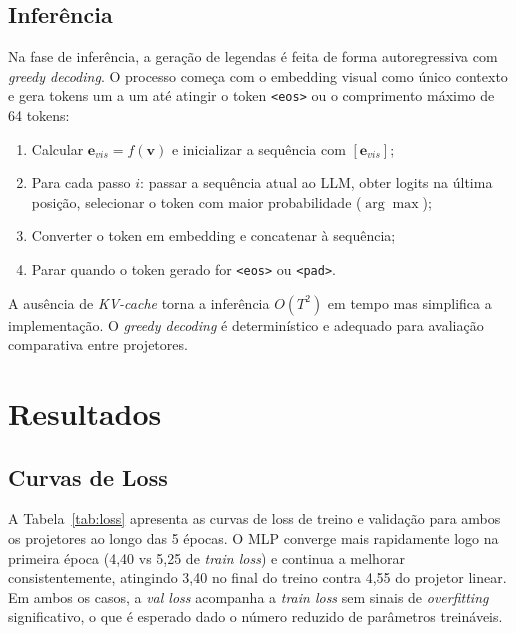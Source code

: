 \documentclass[conference]{IEEEtran}
\begin{document}
\subsection{Inferência}

Na fase de inferência, a geração de legendas é feita de forma autoregressiva com \textit{greedy decoding}. O processo começa com o embedding visual como único contexto e gera tokens um a um até atingir o token \texttt{<eos>} ou o comprimento máximo de 64 tokens:

\begin{enumerate}
    \item Calcular $\mathbf{e}_{vis} = f(\mathbf{v})$ e inicializar a sequência com $[\mathbf{e}_{vis}]$;
    \item Para cada passo $i$: passar a sequência atual ao LLM, obter logits na última posição, selecionar o token com maior probabilidade ($\arg\max$);
    \item Converter o token em embedding e concatenar à sequência;
    \item Parar quando o token gerado for \texttt{<eos>} ou \texttt{<pad>}.
\end{enumerate}

A ausência de \textit{KV-cache} torna a inferência $O(T^2)$ em tempo mas simplifica a implementação. O \textit{greedy decoding} é determinístico e adequado para avaliação comparativa entre projetores.


\section{Resultados}

\subsection{Curvas de Loss}

A Tabela~\ref{tab:loss} apresenta as curvas de loss de treino e validação para ambos os projetores ao longo das 5 épocas. O MLP converge mais rapidamente logo na primeira época (4,40 vs 5,25 de \textit{train loss}) e continua a melhorar consistentemente, atingindo 3,40 no final do treino contra 4,55 do projetor linear. Em ambos os casos, a \textit{val loss} acompanha a \textit{train loss} sem sinais de \textit{overfitting} significativo, o que é esperado dado o número reduzido de parâmetros treináveis.
\end{document}
